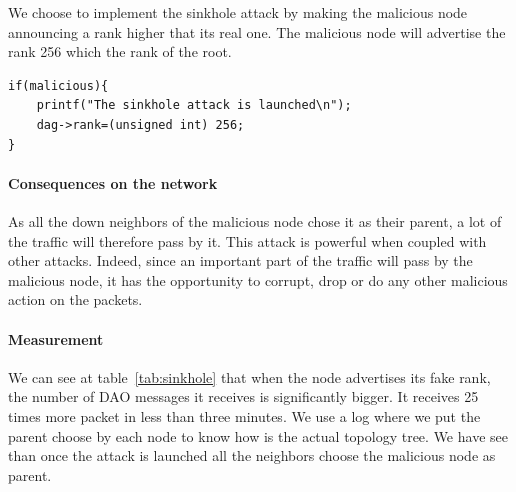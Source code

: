 \documentclass{report}
\begin{document}
We choose to implement the sinkhole attack by making the malicious node
announcing a rank higher that its real one. The malicious node will
advertise the rank 256 which the rank of the root.

\begin{lstlisting}[caption={Sinkhole attack done in the rpl-icmp6.c in the method dio output}]
if(malicious){
	printf("The sinkhole attack is launched\n");
	dag->rank=(unsigned int) 256;
}
\end{lstlisting}

\paragraph{Consequences on the network}

As all the down neighbors of the malicious node chose it as their
parent, a lot of the traffic will therefore pass by it. This attack is
powerful when coupled with other attacks. Indeed, since an important
part of the traffic will pass by the malicious node, it has the
opportunity to corrupt, drop or do any other malicious action on the
packets.


\paragraph{Measurement}

We can see at table~\ref{tab:sinkhole} that when the node advertises its fake rank, the number of
DAO messages it receives is significantly bigger. It receives 25 times
more packet in less than three minutes. We use a log where we put the
parent choose by each node to know how is the actual topology tree. We
have see than once the attack is launched all the neighbors choose the
malicious node as parent. 



\begin{table}
	\centering
    \caption{Impact of  sinkhole on DAO MSG}
    \label{tab:sinkhole}
\end{table}
\end{document}
